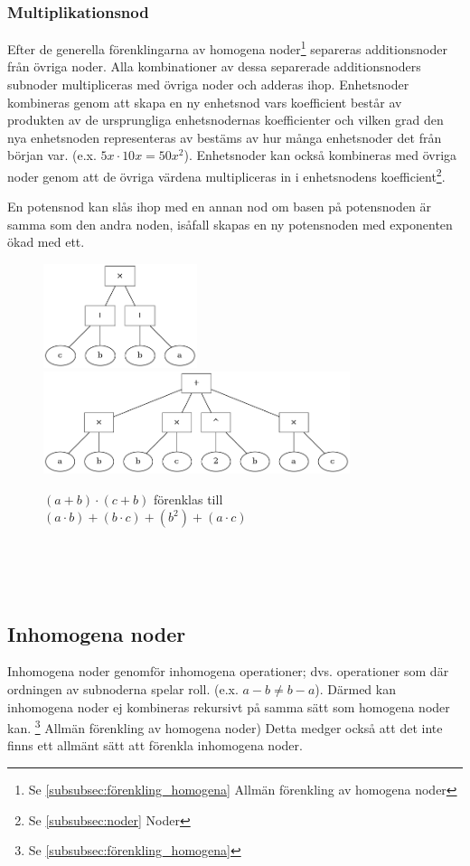 \documentclass[12pt,a4paper]{article}
\begin{document}
\subsubsection{Multiplikationsnod}
Efter de generella förenklingarna av homogena noder\footnote{Se \ref{subsubsec:förenkling_homogena} Allmän förenkling av homogena noder} separeras additionsnoder från övriga noder. Alla kombinationer av dessa separerade additionsnoders subnoder multipliceras med övriga noder och adderas ihop. Enhetsnoder kombineras genom att skapa en ny enhetsnod vars koefficient består av produkten av de ursprungliga enhetsnodernas koefficienter och vilken grad den nya enhetsnoden representeras av bestäms av hur många enhetsnoder det från början var. (e.x. \(5x \cdot 10x = 50x^{2}\)). Enhetsnoder kan också kombineras med övriga noder genom att de övriga värdena multipliceras in i enhetsnodens koefficient\footnote{Se \ref{subsubsec:noder} Noder}.\par
En potensnod kan slås ihop med en annan nod om basen på potensnoden är samma som den andra noden, isåfall skapas en ny potensnoden med exponenten ökad med ett.
\begin{figure}[h!]
  \centering
  \includegraphics[width=0.4\textwidth]{image26}
  \includegraphics[width=0.8\textwidth]{image32}
  \caption{\((a + b) \cdot (c + b)\) förenklas till \((a \cdot b) + (b \cdot c) + (b ^ 2) + (a \cdot c)\)}
\end{figure}
\\
\\
\\
\subsection{Inhomogena noder}
\label{subsec:inhomogena_noder}
Inhomogena noder genomför inhomogena operationer; dvs. operationer som där ordningen av subnoderna spelar roll. (e.x. \(a - b \neq b - a\)). Därmed kan inhomogena noder ej kombineras rekursivt på samma sätt som homogena noder kan. \footnote{Se \ref{subsubsec:förenkling_homogena}} Allmän förenkling av homogena noder) Detta medger också att det inte finns ett allmänt sätt att förenkla inhomogena noder.
\end{document}
